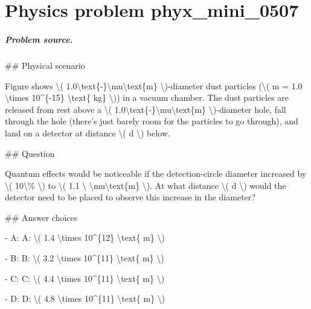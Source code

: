 
\chapter{Physics problem phyx\_mini\_0507}
\label{ch:PhyXMiniProblems_problem_phyx_mini_0507}

\paragraph{Problem source.}
\#\# Physical scenario

Figure shows \textbackslash{}( 1.0\textbackslash{}text\{-\}\textbackslash{}mu\textbackslash{}text\{m\} \textbackslash{})-diameter dust particles (\textbackslash{}( m = 1.0 \textbackslash{}times 10\textasciicircum{}\{-15\} \textbackslash{}text\{ kg\} \textbackslash{})) in a vacuum chamber. The dust particles are released from rest above a \textbackslash{}( 1.0\textbackslash{}text\{-\}\textbackslash{}mu\textbackslash{}text\{m\} \textbackslash{})-diameter hole, fall through the hole (there's just barely room for the particles to go through), and land on a detector at distance \textbackslash{}( d \textbackslash{}) below.

\#\# Question

Quantum effects would be noticeable if the detection-circle diameter increased by \textbackslash{}( 10\textbackslash{}\% \textbackslash{}) to \textbackslash{}( 1.1 \textbackslash{} \textbackslash{}mu\textbackslash{}text\{m\} \textbackslash{}). At what distance \textbackslash{}( d \textbackslash{}) would the detector need to be placed to observe this increase in the diameter?

\#\# Answer choices

- A: A: \textbackslash{}( 1.4 \textbackslash{}times 10\textasciicircum{}\{12\} \textbackslash{}text\{ m\} \textbackslash{})

- B: B: \textbackslash{}( 3.2 \textbackslash{}times 10\textasciicircum{}\{11\} \textbackslash{}text\{ m\} \textbackslash{})

- C: C: \textbackslash{}( 4.4 \textbackslash{}times 10\textasciicircum{}\{11\} \textbackslash{}text\{ m\} \textbackslash{})

- D: D: \textbackslash{}( 4.8 \textbackslash{}times 10\textasciicircum{}\{11\} \textbackslash{}text\{ m\} \textbackslash{})

